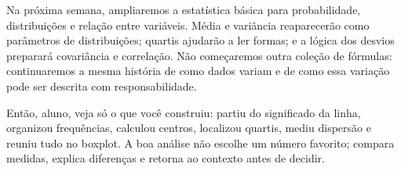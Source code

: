Na próxima semana, ampliaremos a estatística básica para probabilidade, distribuições e relação entre variáveis. Média e variância reaparecerão como parâmetros de distribuições; quartis ajudarão a ler formas; e a lógica dos desvios preparará covariância e correlação. Não começaremos outra coleção de fórmulas: continuaremos a mesma história de como dados variam e de como essa variação pode ser descrita com responsabilidade.

\begin{SummaryBox}
Então, aluno, veja só o que você construiu: partiu do significado da linha, organizou frequências, calculou centros, localizou quartis, mediu dispersão e reuniu tudo no boxplot. A boa análise não escolhe um número favorito; compara medidas, explica diferenças e retorna ao contexto antes de decidir.
\end{SummaryBox}
